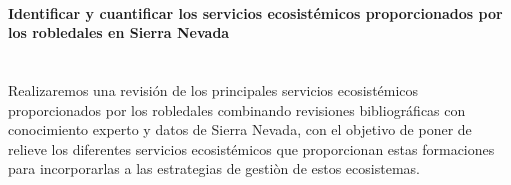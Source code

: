 \paragraph{Identificar y cuantificar los servicios ecosistémicos proporcionados por los robledales en Sierra Nevada}\mbox{} \\
Realizaremos una revisión de los principales servicios ecosistémicos proporcionados por los robledales combinando revisiones bibliográficas con conocimiento experto y datos de Sierra Nevada, con el objetivo de poner de relieve los diferentes servicios ecosistémicos que proporcionan estas formaciones para incorporarlas a las estrategias de gestiòn de estos ecosistemas. 

